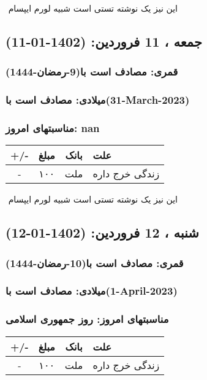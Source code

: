 \documentclass{article}
\newcommand{\rnote}[1]{\marginpar{\textcolor{color}{\StrSubstitute{\##1}{ }{\_}}}}
\newcommand{\myRow}[4]{
    #1 & #2 & #3 & #4 \\ \hline
}
\begin{document}
‌
\rnote{تست}
این نیز یک نوشته تستی است شبیه لورم ایپسام




\newpage
{}
\textcolor{color}{
\section{ جمعه ، 11 فروردین: (1402-01-11) }
\subsubsection*{قمری: مصادف است با(9-رمضان-1444)} 
\subsubsection*{میلادی: مصادف است با(31-March-2023)}
\subsubsection*{مناسبتهای امروز: nan}
}


\begin{tabular}{ | c | c | c | p{5cm} |}
    \hline
    \myRow{ +/- }{مبلغ}{بانک}{علت}
    \myRow{-}{۱۰۰}{ملت}{زندگی خرج داره}
\end{tabular}
\newline
\newline

‌
\rnote{تست}
این نیز یک نوشته تستی است شبیه لورم ایپسام




\newpage
{}
\textcolor{color}{
\section{ شنبه ، 12 فروردین: (1402-01-12) }
\subsubsection*{قمری: مصادف است با(10-رمضان-1444)} 
\subsubsection*{میلادی: مصادف است با(1-April-2023)}
\subsubsection*{مناسبتهای امروز: روز جمهوری اسلامی}
}


\begin{tabular}{ | c | c | c | p{5cm} |}
    \hline
    \myRow{ +/- }{مبلغ}{بانک}{علت}
    \myRow{-}{۱۰۰}{ملت}{زندگی خرج داره}
\end{tabular}
\newline
\newline
\end{document}
